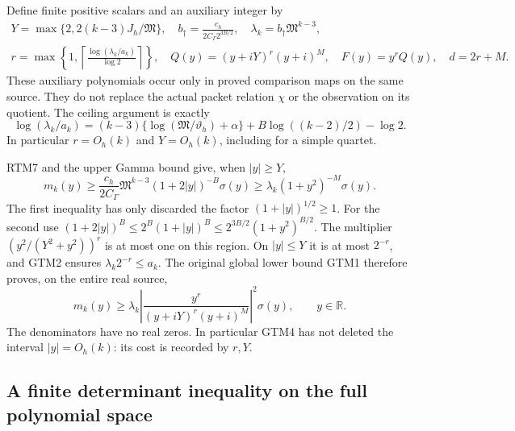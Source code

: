\documentclass[11pt,a4paper]{article}
\begin{document}
Define finite positive scalars and an auxiliary integer by
\begin{equation}\tag{GTM2}
 \begin{gathered}
 Y=\max\{2,2(k-3)J_h/\mathfrak M\},\quad
 b_\dagger=\frac{c_h}{2C_\Gamma2^{3B/2}},\quad
 \lambda_k=b_\dagger\mathfrak M^{k-3},\\
 r=\max\left\{1,\left\lceil
       \frac{\log(\lambda_k/a_k)}{\log2}\right\rceil\right\},\quad
 Q(y)=(y+iY)^r(y+i)^M,\quad F(y)=y^rQ(y),\quad d=2r+M.
 \end{gathered}
\end{equation}
These auxiliary polynomials occur only in proved comparison maps on
the same source.  They do not replace the actual packet relation
$\chi$ or the observation on its quotient.  The ceiling argument is
exactly
\begin{equation}\tag{GTM3}
 \log(\lambda_k/a_k)
 =(k-3)\{\log(\mathfrak M/\vartheta_h)+\alpha\}
      +B\log((k-2)/2)-\log2.
\end{equation}
In particular $r=O_h(k)$ and $Y=O_h(k)$, including for a simple quartet.

RTM7 and the upper Gamma bound give, when $|y|\ge Y$,
\[
 m_k(y)\ge\frac{c_h}{2C_\Gamma}\mathfrak M^{k-3}
       (1+2|y|)^{-B}\sigma(y)
 \ge\lambda_k(1+y^2)^{-M}\sigma(y).
\]
The first inequality has only discarded the factor $(1+|y|)^{1/2}\ge1$.
For the second use
$(1+2|y|)^B\le2^B(1+|y|)^B
\le2^{3B/2}(1+y^2)^{B/2}$.
The multiplier $(y^2/(Y^2+y^2))^r$ is at most one on this region.
On $|y|\le Y$ it is at most $2^{-r}$, and GTM2 ensures
$\lambda_k2^{-r}\le a_k$.  The original global lower bound GTM1
therefore proves, on the entire real source,
\begin{equation}\tag{GTM4}
 \boxed{m_k(y)\ge\lambda_k
    \left|\frac{y^r}{(y+iY)^r(y+i)^M}\right|^2\sigma(y),
                      \qquad y\in\mathbb R.}
\end{equation}
The denominators have no real zeros.  In particular GTM4 has not
deleted the interval $|y|=O_h(k)$: its cost is recorded by $r,Y$.

\subsection{A finite determinant inequality on the full polynomial space}
\end{document}
